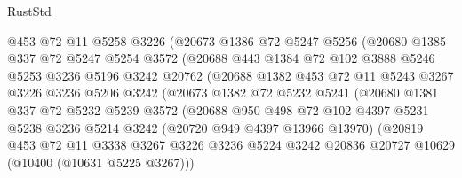 \begin{lexlean}{RustStd}
\begin{coremodule}
                  @453
                  @72
                  @11
                  @5258
                  @3226
                  (@20673
                    @1386
                    @72
                    @5247
                    @5256
                    (@20680
                      @1385
                      @337
                      @72
                      @5247
                      @5254
                      @3572
                      (@20688
                        @443
                        @1384
                        @72
                        @102
                        @3888
                        @5246
                        @5253
                        @3236
                        @5196
                        @3242
                        @20762
                        (@20688
                          @1382
                          @453
                          @72
                          @11
                          @5243
                          @3267
                          @3226
                          @3236
                          @5206
                          @3242
                          (@20673
                            @1382
                            @72
                            @5232
                            @5241
                            (@20680
                              @1381
                              @337
                              @72
                              @5232
                              @5239
                              @3572
                              (@20688
                                @950
                                @498
                                @72
                                @102
                                @4397
                                @5231
                                @5238
                                @3236
                                @5214
                                @3242
                                (@20720 @949 @4397 @13966 @13970)
                                (@20819
                                  @453
                                  @72
                                  @11
                                  @3338
                                  @3267
                                  @3226
                                  @3236
                                  @5224
                                  @3242
                                  @20836
                                  @20727
                                  @10629
                                  (@10400 (@10631 @5225 @3267)))

\end{coremodule}
\end{lexlean}
